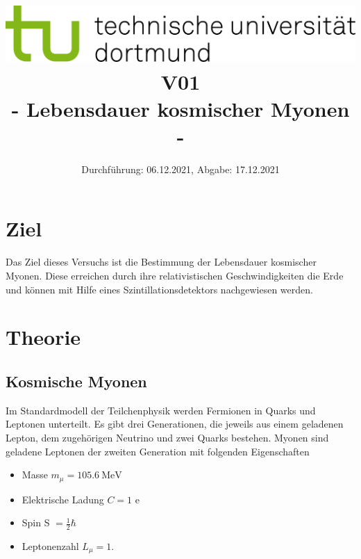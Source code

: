 
\usepackage{romannum}
\usepackage{listings}
\lstset{numbers=left, numberstyle=\tiny, numbersep=5pt}
\lstset{language=Perl}

\title{\includegraphics[scale=0.8]{../logo.jpg} \\ \vspace*{1cm} V01 \\ - Lebensdauer kosmischer Myonen -}

\date{Durchführung: 06.12.2021, Abgabe: 17.12.2021}


\frontmatter

\maketitle

\tableofcontents
\newpage

\mainmatter

\section{Ziel}
Das Ziel dieses Versuchs ist die Bestimmung der Lebensdauer kosmischer Myonen. Diese erreichen durch ihre relativistischen Geschwindigkeiten die Erde und können mit Hilfe eines Szintillationsdetektors nachgewiesen werden.

\section{Theorie}

\subsection{Kosmische Myonen}
Im Standardmodell der Teilchenphysik werden Fermionen in Quarks und Leptonen unterteilt. 
Es gibt drei Generationen, die jeweils aus einem geladenen Lepton, dem zugehörigen Neutrino und zwei Quarks bestehen. Myonen sind geladene Leptonen der zweiten Generation mit folgenden Eigenschaften
\begin{itemize}
    \item Masse $ m_{\mu} = \SI{105.6}{\mega\electronvolt}$
    \item Elektrische Ladung $C = 1$ e
    \item Spin S $= \frac{1}{2} \hbar$
    \item Leptonenzahl $L_{\mu} = 1$.
\end{itemize}

